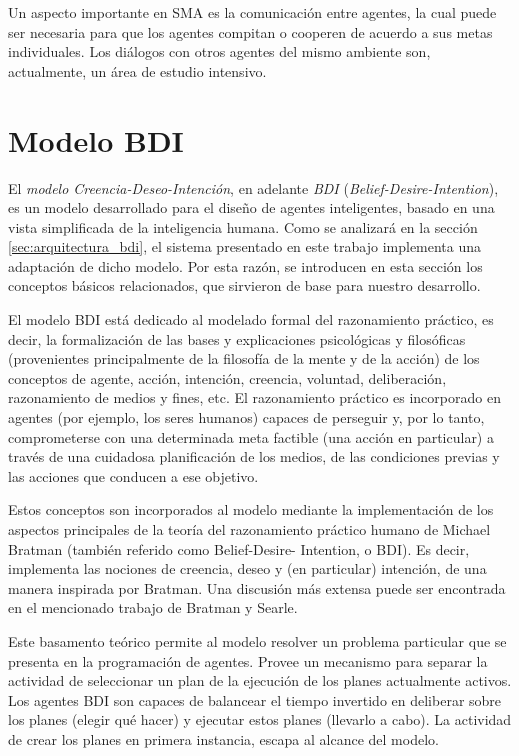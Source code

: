  Un aspecto importante en SMA es la comunicación entre agentes, la cual
 puede ser necesaria para que los agentes compitan o cooperen de
 acuerdo a sus metas individuales. 
 Los diálogos con otros agentes del mismo ambiente son, actualmente, un
 área de estudio intensivo.

\section{Modelo BDI}
 \label{sec:modelo_bdi}
 
 El \textit{modelo Creencia-Deseo-Intención}, en adelante \textit{BDI}
 (\textit{Belief-Desire-Intention}), es un modelo desarrollado para el
 diseño de agentes inteligentes, basado en una vista simplificada de la
 inteligencia humana.
 Como se analizará en la sección \ref{sec:arquitectura_bdi}, el sistema
 presentado en este trabajo implementa una  adaptación de dicho modelo.
 Por esta razón, se introducen en esta sección los  conceptos básicos
 relacionados, que sirvieron de base para nuestro desarrollo.
 
 El modelo BDI está dedicado al modelado formal del razonamiento
 práctico, es  decir, la formalización de las bases y explicaciones
 psicológicas y filosóficas  (provenientes principalmente de la
 filosofía de la mente y de la acción) de los  conceptos de agente,
 acción, intención, creencia, voluntad, deliberación,  razonamiento de
 medios y fines, etc.
 El razonamiento práctico es incorporado  en agentes (por ejemplo, los
 seres humanos) capaces de perseguir y, por lo tanto,  comprometerse
 con una determinada meta factible (una acción en particular)  a través
 de una cuidadosa planificación de los medios, de las condiciones
 previas  y las acciones que conducen a ese objetivo.

 Estos conceptos son incorporados al modelo mediante la implementación
 de los  aspectos principales de la teoría del razonamiento práctico
 humano de Michael Bratman (también referido como Belief-Desire-
 Intention, o BDI).
 Es decir, implementa  las nociones de creencia, deseo y (en
 particular) intención, de una manera inspirada  por Bratman.
 Una discusión más extensa puede ser encontrada en el mencionado
 trabajo de Bratman\cite{brat99} y Searle\cite{searle1985}.
 
 Este basamento teórico permite al modelo resolver un problema
 particular que  se presenta en la programación de agentes.
 Provee un mecanismo para separar la  actividad de seleccionar un plan
 de la ejecución de los planes actualmente activos.
 Los agentes BDI son capaces de balancear el tiempo invertido en
 deliberar sobre los planes (elegir qué hacer) y ejecutar estos planes
 (llevarlo a cabo).
 La actividad  de crear los planes en primera instancia, escapa al
 alcance del modelo.

